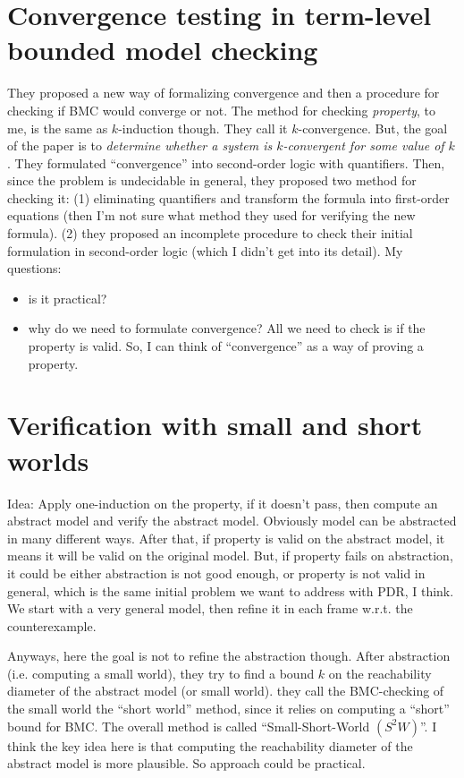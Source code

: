 \section{Convergence testing in term-level bounded model checking \cite{bryant2003convergence}}
They proposed a new way of formalizing convergence and
then a procedure for checking if BMC would converge or not.
The method for checking \emph{property}, to me, is the same as $k$-induction though.
They call it $k$-convergence. But, the goal of the paper is to \emph{determine whether a system is $k$-convergent for some
value of $k$}. They formulated ``convergence'' into second-order logic with quantifiers.
Then, since the problem is undecidable in general, they proposed two method for checking it:
(1) eliminating quantifiers and transform the formula into
first-order equations (then I'm not sure what method they used for verifying the new formula).
(2) they proposed an incomplete procedure to check their initial formulation in second-order logic (which I didn't get into its detail).
\linebreak
\linebreak
My questions:
\begin{itemize}
  \item is it practical?
  \item why do we need to formulate convergence?
  All we need to check is if the property is valid.
  So, I can think of ``convergence'' as a way of proving a property.
\end{itemize}

\section{Verification with small and short worlds \cite{sinha2012verification}}
Idea: Apply one-induction on the property, if it doesn't pass,
then compute an abstract model and verify the abstract model.
Obviously model can be abstracted in many different ways. After that, if property is valid on the abstract model, it means it will be valid on the original model. But, if property fails on abstraction, it could be either abstraction is not good enough, or property is not valid in general, which is the same initial problem we want to address with PDR, I think. We start with a very general model, then refine it in each frame w.r.t. the counterexample. 

Anyways, here the goal is not to refine the abstraction though. After abstraction (i.e. computing a small world), they  try  to  find  a  bound
$k$ on  the  reachability  diameter  of  the abstract model (or  small  world).
they call the BMC-checking of the small world the
``short world'' method, since it relies on computing a ``short''
bound  for  BMC.   The overall method is called ``Small-Short-World $(S^2W)$''. 
I think the key idea here is that computing the reachability diameter of the abstract model 
is more plausible. So approach could be practical.

